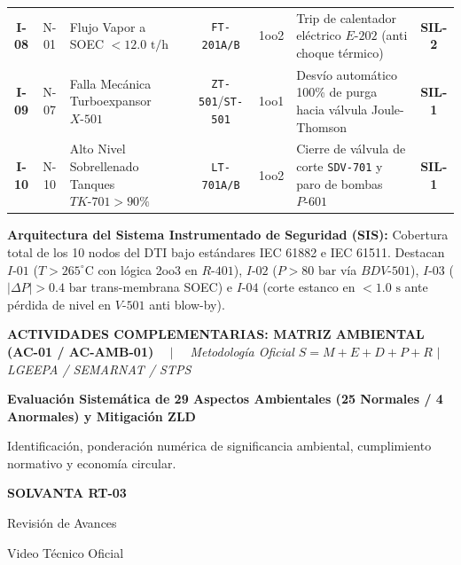 \documentclass[10pt,landscape]{article}
\newcommand{\badgeamber}[1]{\colorbox{badgeamber}{\textbf{\color{amber!90!black}\fontsize{6.8pt}{8pt}\selectfont #1}}}
\newcommand{\badgered}[1]{\colorbox{badgered}{\textbf{\color{darkred}\fontsize{6.8pt}{8pt}\selectfont #1}}}
\newcommand{\slideheader}[4]{%
  \noindent
  \begin{minipage}[c]{0.78\textwidth}
    {\fontsize{7pt}{8.5pt}\selectfont \textbf{\color{accentcyan}#1} \ \ $|$ \ \ \textit{\color{black!70}#2}}\par
    \vspace{1.5pt}
    {\fontsize{11.5pt}{13.5pt}\selectfont \textbf{\color{navyblue}#3}}\par
    \vspace{1.5pt}
    {\fontsize{7.0pt}{8.5pt}\selectfont \color{black!80}#4}
  \end{minipage}
  \hfill
  \begin{minipage}[c]{0.20\textwidth}
    \begin{tcolorbox}[colback=navyblue,colframe=navyblue,arc=1.5mm,boxrule=0pt,top=2pt,bottom=2pt,left=4pt,right=4pt]
      \centering
      {\color{white}\fontsize{7.2pt}{8.5pt}\selectfont \textbf{SOLVANTA RT-03}}\par
      \vspace{1pt}
      {\color{accentcyan}\fontsize{5.8pt}{7.0pt}\selectfont Revisión de Avances}\par
      {\color{white!80}\fontsize{5.2pt}{6.5pt}\selectfont Video Técnico Oficial}
    \end{tcolorbox}
  \end{minipage}
  \par\vspace{2pt}
  \noindent{\color{navyblue}\rule{\textwidth}{0.8pt}}
  \par\vspace{2pt}
}
\begin{document}
\begin{center}
\begin{tcolorbox}[colback=white,colframe=navyblue!70,arc=1.5mm,boxrule=0.7pt,top=2.0pt,bottom=2.0pt,left=3pt,right=3pt,width=\textwidth]
\begin{tabularx}{\textwidth}{c c p{3.2cm} c c X c}
      \rowcolor{rowodd}
      \textbf{I-08} & N-01 & Flujo Vapor a SOEC $< 12.0\text{ t/h}$ & \texttt{FT-201A/B} & 1oo2 & Trip de calentador eléctrico $E\text{-}202$ (anti choque térmico) & \badgered{SIL-2} \\
      \rowcolor{roweven}
      \textbf{I-09} & N-07 & Falla Mecánica Turboexpansor $X\text{-}501$ & \texttt{ZT-501}/\texttt{ST-501} & 1oo1 & Desvío automático 100\% de purga hacia válvula Joule-Thomson & \badgeamber{SIL-1} \\
      \rowcolor{rowodd}
      \textbf{I-10} & N-10 & Alto Nivel Sobrellenado Tanques $TK\text{-}701 > 90\%$ & \texttt{LT-701A/B} & 1oo2 & Cierre de válvula de corte \texttt{SDV-701} y paro de bombas $P\text{-}601$ & \badgeamber{SIL-1} \\
      \bottomrule
    \end{tabularx}
  \end{tcolorbox}
\end{center}

\vspace{-2pt}
\begin{tcolorbox}[colback=softblue,colframe=accentcyan!50,arc=1mm,boxrule=0.5pt,top=1.5pt,bottom=1.5pt,left=6pt,right=6pt]
  \scriptsize
  \textbf{\color{navyblue}Arquitectura del Sistema Instrumentado de Seguridad (SIS):} 
  Cobertura total de los 10 nodos del DTI bajo estándares IEC 61882 e IEC 61511. Destacan $I\text{-}01$ ($T > 265^\circ\text{C}$ con lógica 2oo3 en $R\text{-}401$), $I\text{-}02$ ($P > 80\text{ bar}$ vía $BDV\text{-}501$), $I\text{-}03$ ($|\Delta P| > 0.4\text{ bar}$ trans-membrana SOEC) e $I\text{-}04$ (corte estanco en $<1.0\text{ s}$ ante pérdida de nivel en $V\text{-}501$ anti blow-by).
\end{tcolorbox}

\newpage


\slideheader{ACTIVIDADES COMPLEMENTARIAS: MATRIZ AMBIENTAL (AC-01 / AC-AMB-01)}{Metodología Oficial $S = M+E+D+P+R$ $|$ LGEEPA / SEMARNAT / STPS}{Evaluación Sistemática de 29 Aspectos Ambientales (25 Normales / 4 Anormales) y Mitigación ZLD}{Identificación, ponderación numérica de significancia ambiental, cumplimiento normativo y economía circular.}
\end{document}
